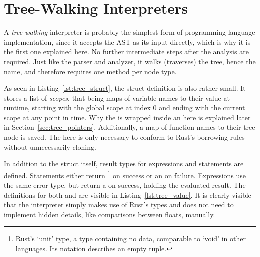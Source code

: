 \section{Tree-Walking Interpreters}
A \emph{tree-walking} interpreter is probably the simplest form of programming language implementation, since it accepts the AST as its input directly, which is why it is the first one explained here.
No further intermediate steps after the analysis are required.
Just like the parser and analyzer, it walks (traverses) the tree, hence the name, and therefore requires one method per node type.

As seen in Listing~\ref{lst:tree_struct}, the struct definition is also rather small.
It stores a list of \emph{scopes}, that being maps of variable names to their value at runtime, starting with the global scope at index 0 and ending with the current scope at any point in time.
Why the  is wrapped inside an  here is explained later in Section~\ref{sec:tree_pointers}.
Additionally, a map of function names to their tree node is saved.
The  here is only necessary to conform to Rust's borrowing rules without unnecessarily cloning.


In addition to the struct itself, result types for expressions and statements are defined.
Statements either return \qVerb{()}\footnote{Rust's `unit' type, a type containing no data, comparable to `void' in other languages. Its notation describes an empty tuple.} on success or an  on failure.
Expressions use the same error type, but return a  on success, holding the evaluated result.
The definitions for both  and  are visible in Listing~\ref{lst:tree_value}.
It is clearly visible that the interpreter simply makes use of Rust's types and does not need to implement hidden details, like comparisons between floats, manually.


